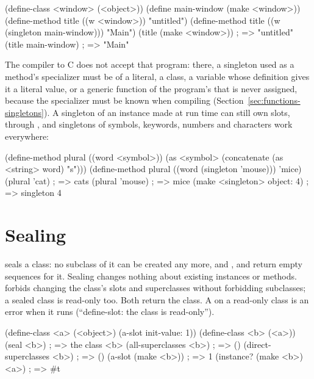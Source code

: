 \begin{dylan}
(define-class <window> (<object>))
(define main-window (make <window>))
(define-method title ((w <window>)) "untitled")
(define-method title ((w (singleton main-window))) "Main")
(title (make <window>))        ; => "untitled"
(title main-window)            ; => "Main"
\end{dylan}

\noindent The compiler to C does not accept that program: there, a
singleton used as a method's specializer must be of a literal, a class, a
variable whose definition gives it a literal value, or a generic function
of the program's that is never assigned, because the
specializer must be known when compiling
(Section~\ref{sec:functions-singletons}). A singleton of an instance made at
run time can still own slots, through , and singletons of
symbols, keywords, numbers and characters work everywhere:

\begin{dylan}
(define-method plural ((word <symbol>))
  (as <symbol> (concatenate (as <string> word) "s")))
(define-method plural ((word (singleton 'mouse))) 'mice)
(plural 'cat)                  ; => cats
(plural 'mouse)                ; => mice
(make <singleton> object: 4)   ; => {singleton 4}
\end{dylan}

\section{Sealing}\label{sec:classes-sealing}

 seals a class: no subclass of it can be created
any more, and ,  and
 return empty sequences for it. Sealing changes
nothing about existing instances or methods.  forbids changing the class's slots and superclasses without
forbidding subclasses; a sealed class is read-only too. Both return the
class. A  on a read-only class is an error when it runs
(``define-slot: the class is read-only'').

\begin{dylan}
(define-class <a> (<object>) (a-slot init-value: 1))
(define-class <b> (<a>))
(seal <b>)                     ; => {the class <b>}
(all-superclasses <b>)         ; => ()
(direct-superclasses <b>)      ; => ()
(a-slot (make <b>))            ; => 1
(instance? (make <b>) <a>)     ; => #t
\end{dylan}

